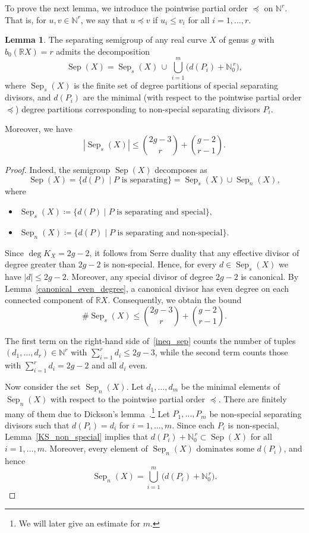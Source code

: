 \documentclass[x11names,oneside,11pt]{amsart}
\theoremstyle{definition}
\newtheorem{lemma}{Lemma}
\theoremstyle{remark}
\DeclareMathOperator{\Sep}{Sep}
\newcommand{\N}{\mathbb{N}}
\newcommand{\R}{\mathbb{R}}
\begin{document}
  To prove the next lemma, we introduce the pointwise partial order $\preceq$ on $\N^r$.  That is, for $u, v \in \N^r$, we say that $u \preceq v$ if $u_i \leqslant v_i$ for all $i = 1, \ldots, r$.

  \begin{lemma}\label{main_lemma}
  The separating semigroup of any real curve $X$ of genus $g$ with $b_0(\R X) = r$ admits the decomposition
  \[
    \Sep(X) = \Sep_s(X) \,\cup\, \bigcup_{i=1}^{m} \bigl( d(P_i) + \N_0^{\,r} \bigr),
  \]
  where $\Sep_s(X)$ is the finite set of degree partitions of special separating divisors, and $d(P_i)$ are the minimal (with respect to the pointwise partial order $\preceq$) degree partitions  corresponding to non-special separating divisors $P_i$.

  Moreover, we have
  \[
    |\Sep_s(X)| \leqslant \binom{2g - 3}{r} + \binom{g - 2}{r - 1}.
  \]
  \end{lemma}
   \begin{proof}
   Indeed, the semigroup $\Sep(X)$ decomposes as
  \[
    \Sep(X) = \{ d(P) \mid P \text{ is separating} \} = \Sep_s(X) \cup \Sep_n(X),
  \]
  where
  \begin{itemize}
    \item $\Sep_s(X) \coloneqq \{ d(P) \mid P \text{ is separating and special} \},$
    \item $\Sep_n(X) \coloneqq \{ d(P) \mid P \text{ is separating and non-special} \}.$
  \end{itemize}

    Since $\deg K_X = 2g - 2$, it follows from Serre duality that any effective divisor of degree greater than $2g - 2$ is non-special. Hence, for every $d \in \Sep_s(X)$ we have $|d| \leqslant 2g - 2$.  Moreover, any special divisor of degree $2g - 2$ is canonical. By Lemma~\ref{canonical_even_degree}, a canonical divisor has even degree on each connected component of $\R X$. Consequently, we obtain the bound
    \begin{equation}\tag{$\diamond$}
      \#\Sep_s(X) \leqslant \binom{2g - 3}{r} + \binom{g - 2}{r - 1}.\label{ineq_sep}
    \end{equation}

    The first term on the right-hand side of~\eqref{ineq_sep} counts the number of tuples $(d_1, \ldots, d_r) \in \N^r$ with $\sum_{i=1}^r d_i \leqslant 2g - 3$, while the second term counts those with $\sum_{i=1}^r d_i = 2g - 2$ and all $d_i$ even.
        
    Now consider the set $\Sep_n(X)$.  Let $d_1, \dots, d_m$ be the minimal elements of $\Sep_n(X)$ with respect to the pointwise partial order $\preceq$. There are finitely many of them due to  Dickson's lemma~\cite{Dickson_1913}.\footnote{We will later give an estimate for $m$.} Let $P_1, \ldots, P_m$ be non-special separating divisors such that $d(P_i) = d_i$ for $i = 1, \ldots, m$.  Since each $P_i$ is non-special, Lemma~\ref{KS_non_special} implies that $d(P_i) + \N_0^{\,r} \subset \Sep(X)$ for all $i = 1, \ldots, m$.  Moreover, every element of $\Sep_n(X)$ dominates some $d(P_i)$, and hence
    \[
      \Sep_n(X) = \bigcup_{i=1}^{m} \bigl( d(P_i) + \N_0^{\,r} \bigr).
    \]
  \end{proof}   
\end{document}
